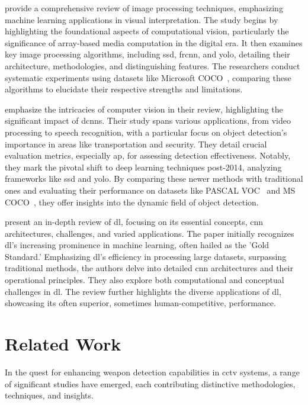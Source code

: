 \citet{rfc8} provide a comprehensive review of image processing techniques, 
emphasizing machine learning applications in visual interpretation. The study begins by highlighting the 
foundational aspects of computational vision, particularly the significance of array-based media computation 
in the digital era. It then examines key image processing algorithms, including \ac{ssd}, \ac{frcnn}, and \ac{yolo}, 
detailing their architecture, methodologies, and distinguishing features. The researchers conduct systematic experiments 
using datasets like Microsoft COCO~\cite{rfc16}, comparing these algorithms to elucidate their respective strengths and 
limitations.

\citet{rfc9} emphasize the intricacies of computer vision in their review, highlighting 
the significant impact of \ac{dcnns}. Their study spans various applications, from video processing to speech 
recognition, with a particular focus on object detection's importance in areas like transportation and security. 
They detail crucial evaluation metrics, especially \ac{ap}, for assessing detection effectiveness. Notably, they 
mark the pivotal shift to deep learning techniques post-2014, analyzing frameworks like \ac{ssd} and \ac{yolo}. 
By comparing these newer methods with traditional ones and evaluating their performance on datasets like 
PASCAL VOC~\cite{rfc27} and MS COCO~\cite{rfc16}, they offer insights into the dynamic field of object detection.

\citet{rfc10} present an in-depth review of \ac{dl}, focusing on its essential 
concepts, \ac{cnn} architectures, challenges, and varied applications. The paper initially recognizes \ac{dl}'s 
increasing prominence in machine learning, often hailed as the 'Gold Standard.' Emphasizing \ac{dl}'s efficiency in 
processing large datasets, surpassing traditional methods, the authors delve into detailed \ac{cnn} architectures 
and their operational principles. They also explore both computational and conceptual challenges in \ac{dl}. The 
review further highlights the diverse applications of \ac{dl}, showcasing its often superior, sometimes 
human-competitive, performance.

\section{Related Work}
In the quest for enhancing weapon detection capabilities in \ac{cctv} systems, a range of significant studies 
have emerged, each contributing distinctive methodologies, techniques, and insights. 

